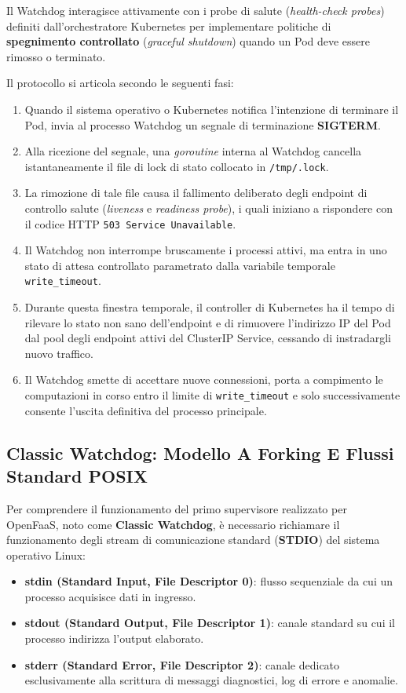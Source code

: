 \documentclass[11pt, a4paper]{article}
\begin{document}
Il Watchdog interagisce attivamente con i probe di salute (\emph{health-check probes}) definiti dall'orchestratore Kubernetes per implementare politiche di \textbf{spegnimento controllato} (\emph{graceful shutdown}) quando un Pod deve essere rimosso o terminato.

Il protocollo si articola secondo le seguenti fasi:
\begin{enumerate}
    \item Quando il sistema operativo o Kubernetes notifica l'intenzione di terminare il Pod, invia al processo Watchdog un segnale di terminazione \textbf{SIGTERM}.
    \item Alla ricezione del segnale, una \emph{goroutine} interna al Watchdog cancella istantaneamente il file di lock di stato collocato in \texttt{/tmp/.lock}.
    \item La rimozione di tale file causa il fallimento deliberato degli endpoint di controllo salute (\emph{liveness} e \emph{readiness probe}), i quali iniziano a rispondere con il codice HTTP \texttt{503 Service Unavailable}.
    \item Il Watchdog non interrompe bruscamente i processi attivi, ma entra in uno stato di attesa controllato parametrato dalla variabile temporale \texttt{write\_timeout}.
    \item Durante questa finestra temporale, il controller di Kubernetes ha il tempo di rilevare lo stato non sano dell'endpoint e di rimuovere l'indirizzo IP del Pod dal pool degli endpoint attivi del ClusterIP Service, cessando di instradargli nuovo traffico.
    \item Il Watchdog smette di accettare nuove connessioni, porta a compimento le computazioni in corso entro il limite di \texttt{write\_timeout} e solo successivamente consente l'uscita definitiva del processo principale.
\end{enumerate}

\subsection{Classic Watchdog: Modello A Forking E Flussi Standard POSIX}

Per comprendere il funzionamento del primo supervisore realizzato per OpenFaaS, noto come \textbf{Classic Watchdog}, è necessario richiamare il funzionamento degli stream di comunicazione standard (\textbf{STDIO}) del sistema operativo Linux:
\begin{itemize}
    \item \textbf{stdin (Standard Input, File Descriptor 0)}: flusso sequenziale da cui un processo acquisisce dati in ingresso.
    \item \textbf{stdout (Standard Output, File Descriptor 1)}: canale standard su cui il processo indirizza l'output elaborato.
    \item \textbf{stderr (Standard Error, File Descriptor 2)}: canale dedicato esclusivamente alla scrittura di messaggi diagnostici, log di errore e anomalie.
\end{itemize}
\end{document}

